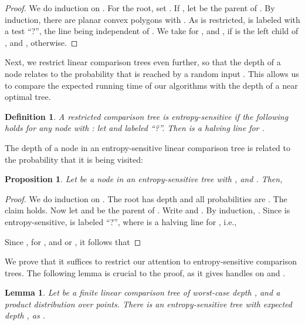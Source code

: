 \documentclass[letterpaper,11pt]{article}
\newtheorem{lemma}[theorem]{Lemma}
\newtheorem{definition}[theorem]{Definition}
\newtheorem{prop}[theorem]{Proposition}
\begin{document}
\begin{proof}
  We do induction on . For the root, 
  set . If 
  , let  be the
  parent of . By induction, there 
  are planar convex polygons  with 
  . 
  As  is restricted,  is 
  labeled with a test 
  ``?'', 
  the line  being independent of 
  . We take  for , 
  and , if  is 
  the left child of , and 
  , otherwise.
\end{proof}

Next, we restrict linear comparison 
trees even further, so that the depth 
of a node  relates to the probability 
that  is reached by a random input 
. This allows us to
compare the expected running time of our algorithms 
with the depth of a near optimal tree.

\begin{definition}
  A restricted 
  comparison tree is 
  \emph{entropy-sensitive} if the 
  following holds for any node 
  with :
  let 
  and  labeled 
  ``\textup{?}''.
  Then  is a halving line for .
\end{definition}

The depth of a node in an entropy-sensitive
linear comparison tree is related to the 
probability that it is being visited:

\begin{prop}\label{prop:entropyDepth}
  Let  be a node in an entropy-sensitive 
  tree with , and 
  .  Then, 
  
\end{prop}

\begin{proof}
  We do induction on . 
  The root has depth  and all 
  probabilities are . The claim 
  holds.  Now let  and 
   be the parent of . 
  Write  
  and . 
  By induction, 
  . 
  Since  is entropy-sensitive,  is 
  labeled  ``?'', 
  where   is a halving line
  for , i.e.,
  
  Since , for , and 
   or 
  ,
  it follows that
  
\end{proof}

We prove that it suffices to restrict our attention to entropy-sensitive comparison trees. 
The following lemma is crucial to the proof, as it gives handles on  and .

\begin{lemma}\label{lem:lin->entropy}
  Let  be a finite linear comparison 
  tree of worst-case depth , and  a product distribution over 
  points. There is an entropy-sensitive 
  tree  with expected depth 
  , as 
  .
\end{lemma}
\end{document}
